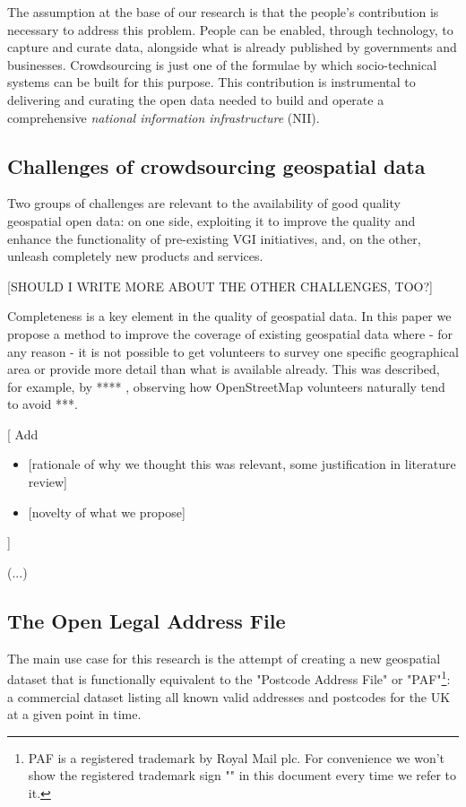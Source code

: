 \documentclass{llncs}
\begin{document}
    The assumption at the base of our research is that the people's contribution is necessary to address this problem. People can be enabled, through technology, to capture and curate data, alongside what is already published by governments and businesses. Crowdsourcing is just one of the formulae by which socio-technical systems can be built for this purpose. This contribution is instrumental to delivering and curating the open data needed to build and operate a comprehensive {\it national information infrastructure} (NII).

\subsection{Challenges of crowdsourcing geospatial data}

    Two groups of challenges are relevant to the availability of good quality geospatial open data: on one side, exploiting it to improve the quality and enhance the functionality of pre-existing VGI initiatives, and, on the other, unleash completely new products and services.
    
    [SHOULD I WRITE MORE ABOUT THE OTHER CHALLENGES, TOO?]
    
    Completeness is a key element in the quality of geospatial data. In this paper we propose a method to improve the coverage of existing geospatial data where - for any reason - it is not possible to get volunteers to survey one specific geographical area or provide more detail than what is available already. This was described, for example, by **** , observing how OpenStreetMap volunteers naturally tend to avoid ***.
    
    {[}
    Add
    \begin{itemize}
    	\item {[}rationale of why we thought this was relevant, some justification in literature review{]}
    	\item {[}novelty of what we propose{]}
    \end{itemize}
    {]}
    
    {(}...{)}

\subsection{The Open Legal Address File}

    The main use case for this research is the attempt of creating a new geospatial dataset that is functionally equivalent to the "Postcode Address File" or "PAF"\footnote{PAF is a registered trademark by Royal Mail plc. For convenience we won't show the registered trademark sign "\textregistered" in this document every time we refer to it.}: a commercial dataset listing all known valid addresses and postcodes for the UK at a given point in time. 
    
\end{document}

